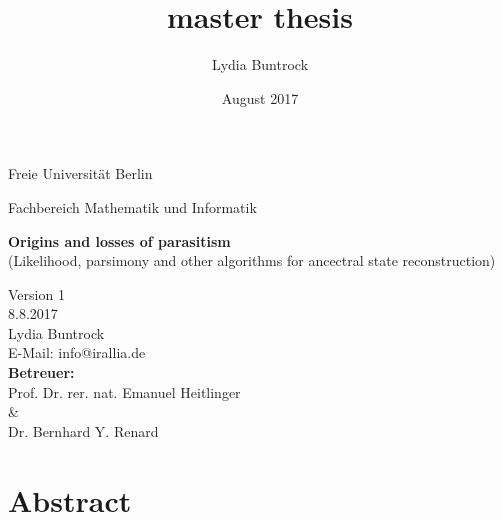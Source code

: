 
\author{Lydia Buntrock}
\title{master thesis}
\date{August 2017}


  \begin{titlepage}
    \pagestyle{empty}
  	\begin{center}
      {\Large Freie Universität Berlin}\\
    	\begin{Huge}
      	Fachbereich Mathematik und Informatik\\
      	\vspace{3mm}
    	\end{Huge}
    	\vspace{20mm}
    	\begin{Large}
    	    \textbf{Origins and losses of parasitism}\\
          (Likelihood, parsimony and other algorithms for ancectral state reconstruction)\\
    	\end{Large}
    	\vspace{8mm}
      Version 1\\
      8.8.2017\\
    	\vspace{2cm}
    	Lydia Buntrock \\
      E-Mail: info@irallia.de\\
     	\vspace{5cm}
    	\textbf{Betreuer:}\\
      Prof. Dr. rer. nat. Emanuel Heitlinger\\
      \& \\
      Dr. Bernhard Y. Renard\\
  	\end{center}
  	\clearpage
  \end{titlepage}

\chapter*{Abstract}


